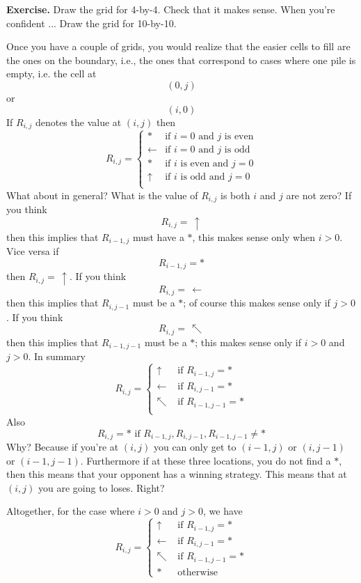 {\bf Exercise.}
Draw the grid for 4-by-4.
Check that it makes sense.
When you're confident ... Draw the grid for 10-by-10.

Once you have a couple of grids, you would realize that the
easier cells to fill are the ones on the boundary, i.e.,
the ones that correspond to cases where one pile is empty, i.e.
the cell at
\[
(0, j)
\]
or 
\[
(i, 0)
\]
If $R_{i,j}$ denotes the value at $(i,j)$ then
\[
R_{i,j} =
\begin{cases}
*          & \text{if $i = 0$ and $j$ is even} \\
\leftarrow & \text{if $i = 0$ and $j$ is odd}  \\ 
*          & \text{if $i$ is even and $j = 0$} \\
\uparrow   & \text{if $i$ is odd and $j = 0$}  \\ 
\end{cases}
\]
What about in general? 
What is the value of $R_{i,j}$ is both $i$ and $j$ are not zero?
If you think 
\[
R_{i,j} = \, \uparrow
\]
then this implies that $R_{i-1,j}$ must have a $*$, this
makes sense only when $i > 0$.
Vice versa if 
\[
R_{i-1, j} = *
\]
then $R_{i,j} = \, \uparrow$.
If you think
\[
R_{i,j} = \, \leftarrow
\]
then this implies that $R_{i, j-1}$ must be a $*$; of course
this makes sense only if $j > 0$.
If you think
\[
R_{i,j} = \, \nwarrow
\]
then this implies that $R_{i-1, j-1}$ must be a $*$;
this makes sense only if $i > 0$ and $j > 0$.
In summary
\[
R_{i,j} =
\begin{cases}
\uparrow    & \text{ if $R_{i-1,j} = *$} \\
\leftarrow  & \text{ if $R_{i,j-1} = *$} \\
\nwarrow    & \text{ if $R_{i-1,j-1} = *$} \\
\end{cases}
\]
Also
\[
R_{i,j} = * \text{ if $R_{i-1,j}, R_{i,j-1}, R_{i-1,j-1} \neq *$}
\]
Why? 
Because if you're at $(i,j)$ you can only get to $(i-1,j)$
or $(i,j-1)$ or $(i-1,j-1)$.
Furthermore if at these three locations, you do not find a $*$,
then this means that your opponent has a winning strategy.
This means that at $(i,j)$ you are going to loses.
Right?

Altogether, for the case where $i>0$ and $j>0$,
we have
\[
R_{i,j} =
\begin{cases}
\uparrow    & \text{ if $R_{i-1,j} = *$} \\
\leftarrow  & \text{ if $R_{i,j-1} = *$} \\
\nwarrow    & \text{ if $R_{i-1,j-1} = *$} \\
*           & \text{ otherwise}
\end{cases}
\]

